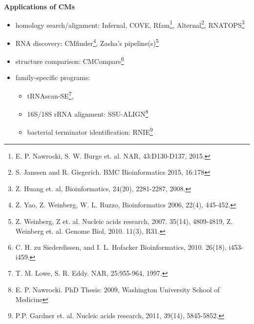 \documentclass[landscape]{slides}
\begin{document}
\begin{slide}
\begin{center}
\textbf{Applications of CMs}
\end{center}

\small
\begin{itemize}
\item homology search/alignment: Infernal,
  COVE, Rfam\footnote{E. P. Nawrocki,
    S. W. Burge et. al.
    NAR, 43:D130-D137, 2015.}, 
    Alternal\footnote{S. Janssen and R. Giegerich. BMC Bioinformatics
      2015, 16:178}, RNATOPS\footnote{Z. Huang et. al, 
      Bioinformatics, 24(20), 2281-2287, 2008.}
    
\item RNA discovery: CMfinder\footnote{Z. Yao, Z. Weinberg, W. L. Ruzzo,
  Bioinformatics 2006, 22(4), 445-452.}, 
  Zasha's pipeline(s)\footnote{Z. Weinberg, Z et. al. Nucleic acids
    research, 2007. 35(14), 4809-4819,
    Z. Weinberg et. al. Genome Biol, 2010. 11(3), R31.}
\item structure comparison: CMCompare\footnote{C. H. zu Siederdissen, and
  I. L. Hofacker Bioinformatics, 2010. 26(18), i453-i459.}
\item family-specific programs: 
\begin{itemize}
\item tRNAscan-SE\footnote{T. M. Lowe, S. R. Eddy. NAR,
    25:955-964, 1997.}, 
\item 16S/18S rRNA alignment: SSU-ALIGN\footnote{ E. P. Nawrocki. PhD
  Thesis: 2009, Washington University School of Medicine}
\item bacterial terminator identification: RNIE\footnote{P.P. Gardner
  et. al. Nucleic acids research, 2011, 39(14), 5845-5852.}
\end{itemize}
\end{itemize}

\vfill 
\end{slide}
\end{document}
